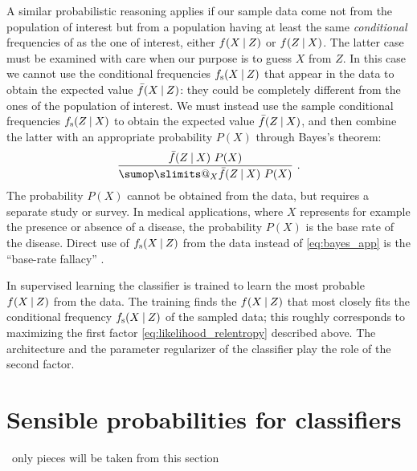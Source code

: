 \documentclass[\ifafour a4paper,12pt,\else a5paper,10pt,\fi%
onecolumn,oneside,article,%
british%
]{memoir}
\makeatletter
\theoremstyle{remark}
\theoremstyle{innote}
\def\sum{\DOTSI\sumop\slimits@}
\newcommand*{\wrench}{{\fontencoding{U}\fontfamily{fontawesomethree}\selectfont\symbol{114}}}
\newcommand{\mynotew}[1]{{\footnotesize\color{notecolour}\wrench\ #1}}
\renewcommand*{\|}[1][]{\nonscript\:#1\vert\nonscript\:\mathopen{}}
\newcommand*{\sect}{\S}%
\newcommand*{\chap}{ch.}%
\newcommand*{\chaps}{chs}%
\newcommand*{\fs}{f_{\textrm{s}}}
\newcommand*{\uf}{\bar{f}}
\makeatother
\begin{document}
A similar probabilistic reasoning applies if our sample data come not from
the population of interest but from a population having at least the same
\emph{conditional} frequencies of as the one of interest, either
$f(X \| Z)$ or $f(Z \| X)$. The latter case must be examined with care when
our purpose is to guess $X$ from $Z$. In this case we cannot use the
conditional frequencies $\fs(X \| Z)$ that appear in the data to obtain the
expected value $\uf(X \| Z)$: they could be completely different from the
ones of the population of interest. We must instead use the sample
conditional frequencies $\fs(Z \| X)$ to obtain the expected value
$\uf(Z \| X)$, and then combine the latter with an appropriate probability
$P(X)$ through Bayes's theorem:
\begin{equation}
  \label{eq:bayes_app}
  \frac{\uf(Z \| X)\ P(X)}{\sum_{X} \uf(Z \| X)\ P(X)} \ .
\end{equation}
The probability $P(X)$ cannot be obtained from the data, but requires a separate study or survey. In medical applications, where $X$ represents for example the presence or absence of a disease, the probability $P(X)$ is the base rate of the disease. Direct use of $\fs(X \| Z)$ from the data instead of \eqref{eq:bayes_app} is the \enquote{base-rate fallacy} \autocites[\sect~12.5]{russelletal1995_r2022}{axelsson2000,jennyetal2018}.




In supervised learning the classifier is trained to learn the most probable $f(X \| Z)$ from the data. The training finds the $f(X \| Z)$ that most closely fits the conditional frequency $\fs(X \| Z)$ of the sampled data; this roughly corresponds to maximizing the first factor \eqref{eq:likelihood_relentropy} described above. The architecture and the parameter regularizer of the classifier play the role of the second factor.




\section{Sensible probabilities for classifiers}
\label{sec:intro}
\mynotew{only pieces will be taken from this section}

\end{document}
